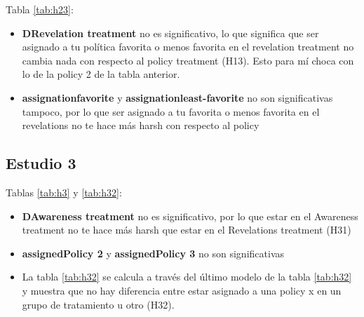 \documentclass[12pt,a4]{article}
\newcommand{\tabpath}{../3. Output/tables/}
\begin{document}
	Tabla \ref{tab:h23}:
	\begin{itemize}
		\item \textbf{DRevelation treatment} no es significativo, lo que significa que ser asignado a tu política favorita o menos favorita en el revelation treatment no cambia nada con respecto al policy treatment (H13). Esto para mí choca con lo de la policy 2 de la tabla anterior.
	\end{itemize}
	
	\begin{itemize}
		\item \textbf{assignationfavorite} y \textbf{assignationleast-favorite} no son significativas tampoco, por lo que ser asignado a tu favorita o menos favorita en el revelations no te hace más harsh con respecto al policy
	\end{itemize}
	
	
	\begin{table}
		\caption{Hipótesis H21 y H22}
			
		\label{tab:h2}
	\end{table}
	
	\begin{table}
		\caption{Hipótesis H22}
			
		\label{tab:h22}
	\end{table}
	
	
	\begin{table}
		\caption{Hipótesis H23}
			
		\label{tab:h23}
	\end{table}
	
\clearpage
	\subsection{Estudio 3}
	
	Tablas \ref{tab:h3} y  \ref{tab:h32}:
	
	\begin{itemize}
		\item \textbf{DAwareness treatment} no es significativo, por lo que estar en el Awareness treatment no te hace más harsh que estar en el Revelations treatment (H31)
		\item \textbf{assignedPolicy 2} y \textbf{assignedPolicy 3} no son significativas
		\item La tabla \ref{tab:h32} se calcula a través del último modelo de la tabla \ref{tab:h32} y muestra que no hay diferencia entre estar asignado a una policy x en un grupo de tratamiento u otro (H32).
	\end{itemize}
	
\end{document}
